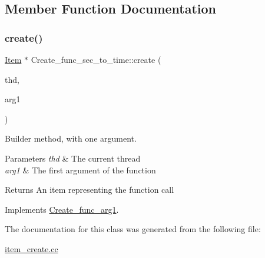 \subsection{Member Function Documentation}
\mbox{\label{classCreate__func__sec__to__time_a2d9bcc4b212b27bbd1c063d14a86ef4c}} 
\subsubsection{\texorpdfstring{create()}{create()}}
{\footnotesize\ttfamily \mbox{\hyperlink{classItem}{Item}} $\ast$ Create\+\_\+func\+\_\+sec\+\_\+to\+\_\+time\+::create (\begin{DoxyParamCaption}\item[{T\+HD $\ast$}]{thd,  }\item[{\mbox{\hyperlink{classItem}{Item}} $\ast$}]{arg1 }\end{DoxyParamCaption})\hspace{0.3cm}{\ttfamily [virtual]}}

Builder method, with one argument. 
\begin{DoxyParams}{Parameters}
{\em thd} & The current thread \\
\hline
{\em arg1} & The first argument of the function \\
\hline
\end{DoxyParams}
\begin{DoxyReturn}{Returns}
An item representing the function call 
\end{DoxyReturn}


Implements \mbox{\hyperlink{classCreate__func__arg1_a3e9a98f755cd82c3e762e334c955a8c9}{Create\+\_\+func\+\_\+arg1}}.



The documentation for this class was generated from the following file\+:\begin{DoxyCompactItemize}
\item 
\mbox{\hyperlink{item__create_8cc}{item\+\_\+create.\+cc}}\end{DoxyCompactItemize}
